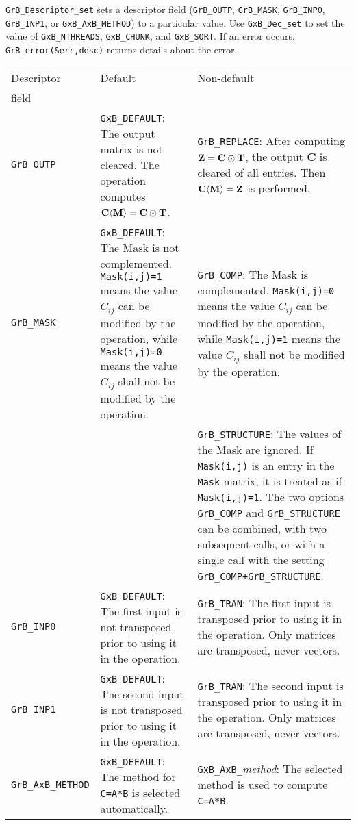 \documentclass[12pt]{article}
\begin{document}
\verb'GrB_Descriptor_set' sets a descriptor field (\verb'GrB_OUTP',
\verb'GrB_MASK', \verb'GrB_INP0', \verb'GrB_INP1', or \verb'GxB_AxB_METHOD') to
a particular value.  Use \verb'GxB_Dec_set' to set the value of
\verb'GxB_NTHREADS', \verb'GxB_CHUNK', and \verb'GxB_SORT'.
If an error occurs, \verb'GrB_error(&err,desc)' returns details about the error.

\vspace{0.2in}
\noindent
{\footnotesize
\begin{tabular}{|l|p{2.4in}|p{2.2in}|}
\hline
Descriptor & Default   & Non-default \\
field      & &  \\
\hline

\verb'GrB_OUTP'
    & \verb'GxB_DEFAULT':
    The output matrix is not cleared.  The operation computes
    ${\bf C \langle M \rangle = C \odot T}$.
    & \verb'GrB_REPLACE':
    After computing ${\bf Z=C\odot T}$,
    the output {\bf C} is cleared of all entries.
    Then ${\bf C \langle M \rangle = Z}$ is performed. \\

\hline

\verb'GrB_MASK'
    & \verb'GxB_DEFAULT':
    The Mask is not complemented.  \verb'Mask(i,j)=1' means the value $C_{ij}$
    can be modified by the operation, while \verb'Mask(i,j)=0' means the value
    $C_{ij}$ shall not be modified by the operation.
    & \verb'GrB_COMP':
    The Mask is complemented.  \verb'Mask(i,j)=0' means the value $C_{ij}$
    can be modified by the operation, while \verb'Mask(i,j)=1' means the value
    $C_{ij}$ shall not be modified by the operation. \\
    &
    & \verb'GrB_STRUCTURE':
    The values of the Mask are ignored.  If \verb'Mask(i,j)' is an entry
    in the \verb'Mask' matrix, it is treated as if \verb'Mask(i,j)=1'.
    The two options \verb'GrB_COMP' and \verb'GrB_STRUCTURE' can be
    combined, with two subsequent calls, or with a single call with the setting
    \verb'GrB_COMP+GrB_STRUCTURE'.  \\

\hline

\verb'GrB_INP0'
    & \verb'GxB_DEFAULT':
    The first input is not transposed prior to using it in the operation.
    & \verb'GrB_TRAN':
    The first input is transposed prior to using it in the operation.  Only
    matrices are transposed, never vectors. \\

\hline

\verb'GrB_INP1'
    & \verb'GxB_DEFAULT':
    The second input is not transposed prior to using it in the operation.
    & \verb'GrB_TRAN':
    The second input is transposed prior to using it in the operation.  Only
    matrices are transposed, never vectors. \\

\hline

\verb'GrB_AxB_METHOD'
    & \verb'GxB_DEFAULT':
    The method for \verb'C=A*B' is selected automatically.
    & \verb'GxB_AxB_'{\em method}: The selected method is used to compute
    \verb'C=A*B'.  \\

\hline
\end{tabular}
}
\end{document}
